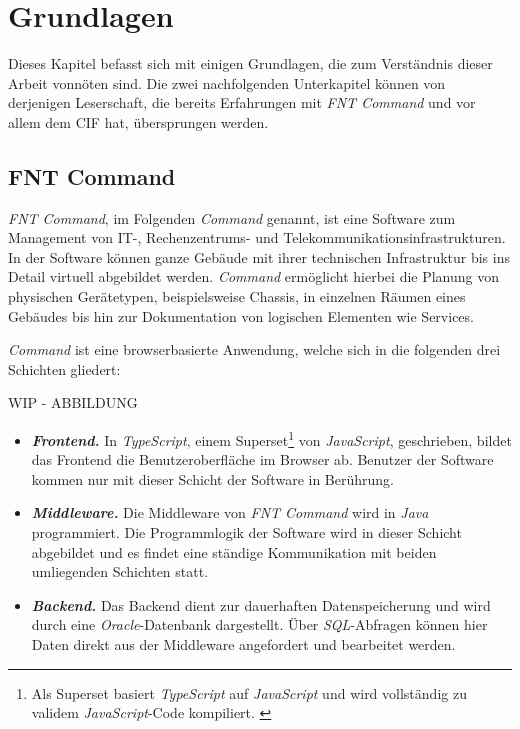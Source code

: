 
\chapter{Grundlagen}\label{ch:grundlagen}
Dieses Kapitel befasst sich mit einigen Grundlagen, die zum Verständnis dieser Arbeit vonnöten sind. Die zwei nachfolgenden Unterkapitel können von derjenigen Leserschaft, die bereits Erfahrungen mit \textit{FNT Command} und vor allem dem \ac{CIF} hat, übersprungen werden.

\section{FNT Command}\label{sec:command}
\textit{FNT Command}, im Folgenden \textit{Command} genannt, ist eine Software zum Management von IT-, Rechenzentrums- und Telekommunikationsinfrastrukturen. In der Software können ganze Gebäude mit ihrer technischen Infrastruktur bis ins Detail virtuell abgebildet werden. \textit{Command} ermöglicht hierbei die Planung von physischen Gerätetypen, beispielsweise Chassis, in einzelnen Räumen eines Gebäudes bis hin zur Dokumentation von logischen Elementen wie Services.

\textit{Command} ist eine browserbasierte Anwendung, welche sich in die folgenden drei Schichten gliedert:

WIP - ABBILDUNG

\begin{itemize}
    \item \textit{\textbf{Frontend.}} In \textit{TypeScript}, einem Superset\footnote{Als Superset basiert \textit{TypeScript} auf \textit{JavaScript} und wird vollständig zu validem \textit{JavaScript}-Code kompiliert. \cite{ts:2021}} von \textit{JavaScript}, geschrieben, bildet das Frontend die Benutzeroberfläche im Browser ab. Benutzer der Software kommen nur mit dieser Schicht der Software in Berührung.
    \item \textit{\textbf{Middleware.}} Die Middleware von \textit{FNT Command} wird in \textit{Java} programmiert. Die Programmlogik der Software wird in dieser Schicht abgebildet und es findet eine ständige Kommunikation mit beiden umliegenden Schichten statt.
    \item \textit{\textbf{Backend.}} Das Backend dient zur dauerhaften Datenspeicherung und wird durch eine \textit{Oracle}-Datenbank dargestellt. Über \textit{\ac{SQL}}-Abfragen können hier Daten direkt aus der Middleware angefordert und bearbeitet werden.
\end{itemize}

